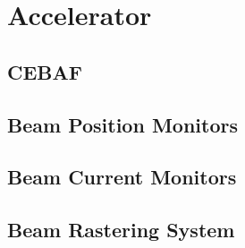 \section{Accelerator}

\subsection{CEBAF}

\subsection{Beam Position Monitors}

\subsection{Beam Current Monitors}

\subsection{Beam Rastering System}
